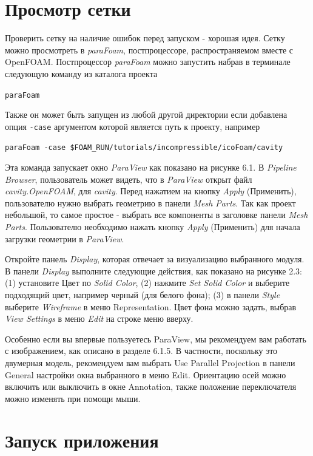 \section{Просмотр сетки}
\label{sec:2.1.2}

Проверить сетку на наличие ошибок перед запуском - хорошая идея.
 Сетку можно просмотреть в \textsl{paraFoam}, постпроцессоре, распространяемом вместе с OpenFOAM.
 Постпроцессор \textsl{paraFoam} можно запустить набрав в терминале следующую команду из каталога проекта 

\texttt{paraFoam}

Также он может быть запущен из любой другой директории если добавлена опция \texttt{-case} аргументом которой является
путь к проекту, например

\texttt{paraFoam -case \$FOAM\_RUN/tutorials/incompressible/icoFoam/cavity}

Эта команда запускает окно \textsl{ParaView} как показано на рисунке 6.1. В \textsl{Pipeline Browser},
 пользователь может видеть, что в \textsl{ParaView} открыт файл \textsl{cavity.OpenFOAM},
 для \textsl{cavity}. Перед нажатием на кнопку \textsl{Apply} (Применить),
 пользователю нужно выбрать геометрию в панели \textsl{Mesh Parts}. Так как проект небольшой, то самое простое - выбрать
 все компоненты в заголовке панели \textsl{Mesh Parts}. Пользователю необходимо нажать кнопку \textsl{Apply} (Применить)
для начала загрузки геометрии в \textsl{ParaView}.

Откройте панель \textsl{Display}, которая отвечает за визуализацию выбранного модуля. В панели \textsl{Display} выполните 
следующие действия, как показано на рисунке 2.3: (1) установите Цвет по \textsl{Solid Color},
 (2) нажмите \textsl{Set Solid Color} и выберите подходящий цвет, например черный (для белого фона);
 (3) в панели \textsl{Style} выберите \textsl{Wireframe} в меню Representation.
 Цвет фона можно задать, выбрав \textsl{View Settings} в меню \textsl{Edit} на строке меню вверху.

Особенно если вы впервые пользуетесь ParaView, мы рекомендуем вам работать с изображением, как описано в разделе 6.1.5.
 В частности, поскольку это двумерная модель, рекомендуем вам выбрать Use Parallel Projection
 в панели General настройки окна выбранного в меню Edit. Ориентацию осей можно включить или выключить
 в окне Annotation, также положение переключателя можно изменять при помощи мыши.

\section{Запуск приложения}
\label{sec:2.1.3}

